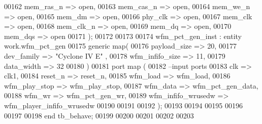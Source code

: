 \begin{DoxyCode}
00162         mem_ras_n               => \textcolor{keywordflow}{open},
00163         mem_cas_n               => \textcolor{keywordflow}{open},
00164         mem_we_n                    => \textcolor{keywordflow}{open},
00165         mem_dm                  => \textcolor{keywordflow}{open},
00166         phy_clk                 => \textcolor{keywordflow}{open},
00167         mem_clk                 => \textcolor{keywordflow}{open},
00168         mem_clk_n               => \textcolor{keywordflow}{open},
00169         mem_dq                  => \textcolor{keywordflow}{open},
00170         mem_dqs                 => \textcolor{keywordflow}{open}
00171 \textcolor{vhdlchar}{)};
00172 
00173 
00174 wfm\_pct\_gen\_inst : \textcolor{keywordflow}{entity} work.wfm_pct_gen
00175     \textcolor{keywordflow}{generic} \textcolor{keywordflow}{map}(
00176         payload_size            => \textcolor{vhdllogic}{20}, 
00177         dev_family              => \textcolor{keyword}{"Cyclone IV E"}  ,  
00178         wfm_infifo_size     => \textcolor{vhdllogic}{11}, 
00179         data_width              => \textcolor{vhdllogic}{32} 
00180 \textcolor{vhdlchar}{)}
00181   \textcolor{keywordflow}{port} \textcolor{keywordflow}{map} (
00182 \textcolor{keyword}{      --input ports }
00183       clk                       => clk1, 
00184       reset_n                   => reset_n, 
00185         wfm_load                    => wfm_load,  
00186         wfm_play_stop           => wfm_play_stop, 
00187         wfm_data                    => wfm_pct_gen_data, 
00188         wfm_wr                  => wfm_pct_gen_wr, 
00189         wfm_infifo_wrusedw  => wfm\_player\_infifo\_wrusedw
00190 
00191    
00192         \textcolor{vhdlchar}{)};
00193 
00194 
00195 
00196 
00197 
00198     \textcolor{keywordflow}{end} \textcolor{vhdlchar}{tb\_behave};
00199   
00200   
00201 
00202 
00203   
\end{DoxyCode}
